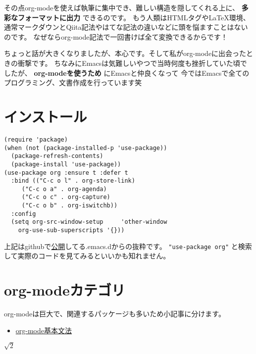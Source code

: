\documentclass[11pt]{article}
\begin{document}
その点org-modeを使えば執筆に集中でき、難しい構造を隠してくれる上に、 \textbf{多彩なフォーマットに出力} できるのです。
もう人類はHTMLタグや\LaTeX{}環境、通常マークダウンとQiita記法やはてな記法の違いなどに頭を悩ますことはないのです。
なぜならorg-mode記法で一回書けば全て変換できるからです！

ちょっと話が大きくなりましたが、本心です。そして私がorg-modeに出会ったときの衝撃です。
ちなみにEmacsは気難しいやつで当時何度も挫折していた頃でしたが、 \textbf{org-modeを使うため} にEmacsと仲良くなって
今ではEmacsで全てのプログラミング、文書作成を行っています笑
\section{インストール}
\label{sec:org2563797}
\begin{verbatim}
(require 'package)
(when (not (package-installed-p 'use-package))
  (package-refresh-contents)
  (package-install 'use-package))
(use-package org :ensure t :defer t
  :bind (("C-c o l" . org-store-link)
	 ("C-c o a" . org-agenda)
	 ("C-c o c" . org-capture)
	 ("C-c o b" . org-iswitchb))
  :config
  (setq org-src-window-setup     'other-window
	org-use-sub-superscripts '{}))
\end{verbatim}
上記はgithubで\href{https://github.com/conao/dotfiles}{公開}してる.emacs.dからの抜粋です。
\texttt{"use-package org"} と検索して実際のコードを見てみるといいかも知れません。
\section{org-modeカテゴリ}
\label{sec:orge34015c}
org-modeは巨大で、関連するパッケージも多いため小記事に分けます。
\begin{itemize}
\item \href{./basis-syntax.org}{org-mode基本文法}
\end{itemize}

\(\sqrt{2}\)
\end{document}

